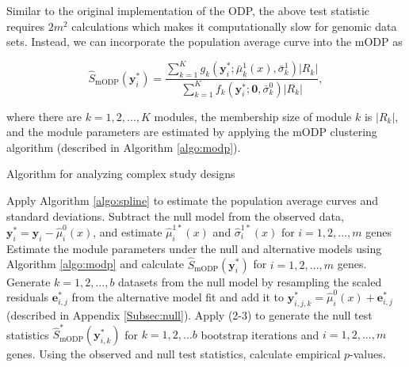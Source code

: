 \documentclass[11pt]{article}
\begin{document}
Similar to the original implementation of the ODP, the above test statistic requires $2m^{2}$ calculations which makes it computationally slow for genomic data sets. Instead, we can incorporate the population average curve into the mODP as

\begin{equation}
\hat{S}_{\text{mODP}}(\mathbf{y}^{*}_{i}) = \dfrac{\sum_{k=1}^{K} g_{k}(\mathbf{y}^{*}_{i}; \bar{\mu}^{1}_{k}(x), \bar{\sigma}_{k}^{1}) |R_{k}|}{\sum_{k=1}^{K}f_{k}(\mathbf{y}^{*}_{i}; \mathbf{0}, \bar{\sigma}_{k}^{0}) |R_{k}|},
\end{equation}

\noindent where there are $k = 1,2, ..., K$ modules, the membership size of module $k$ is $|R_{k}|$, and the module parameters are estimated by applying the mODP clustering algorithm (described in Algorithm \ref{algo:modp}).

\begin{algorithm}[!t] 
 \caption{Algorithm for analyzing complex study designs
  \label{algo:godp}
 }
  Apply Algorithm \ref{algo:spline} to estimate the population average curves and standard deviations. \;
  Subtract the null model from the observed data, $\mathbf{y}^{*}_{i} = \mathbf{y}_{i} - \hat{\mu}_{i}^{0}(x)$, and estimate $\hat{\mu}_{i}^{1*}(x)$ and $\hat{\sigma}_{i}^{1*}(x)$ for $i=1,2,...,m$ genes\;
  Estimate the module parameters under the null and alternative models using Algorithm \ref{algo:modp} and calculate $\hat{S}_{\text{mODP}}(\mathbf{y}^{*}_{i})$ for $i=1,2,...,m$ genes. \;
  Generate $k=1,2,...,b$ datasets from the null model by resampling the scaled residuals $\mathbf{e}^{*}_{i,j}$ from the alternative model fit and add it to $\mathbf{y}_{i,j,k}^{*} = \hat{\mu}_{i}^{0}(x) + \mathbf{e}^{*}_{i,j}$ (described in Appendix \ref{Subsec:null}). \;
  Apply (2-3) to generate the null test statistics $\hat{S}^{*}_{\text{mODP}}(\mathbf{y}_{i,k}^{*})$ for $k = 1,2,...b$ bootstrap iterations and $i=1,2,...,m$ genes. \;
  Using the observed and null test statistics, calculate empirical $p$-values. \;
\end{algorithm}
\end{document}
